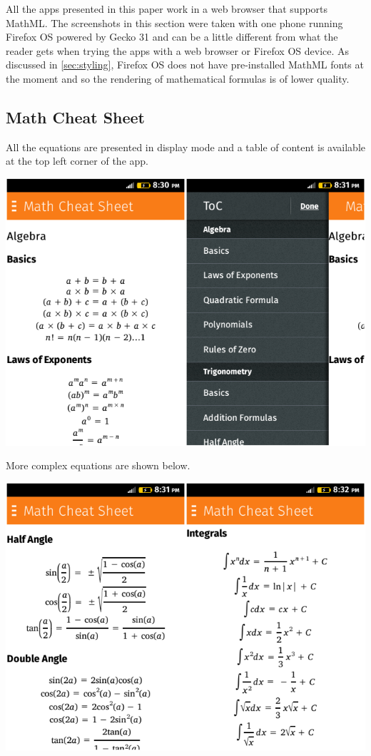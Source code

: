 All the apps presented in this paper work in a web browser that supports MathML.
The screenshots in this section were taken with one phone running Firefox OS
powered by Gecko 31 and can be a little different from what the reader gets when
trying the apps with a web browser or Firefox OS device. As discussed in
\ref{sec:styling}, Firefox OS does not have pre-installed MathML fonts at the
moment and so the rendering of mathematical formulas is of lower quality.

\subsection{Math Cheat Sheet}

All the equations are presented in display mode and a table of content is
available at the top left corner of the app.

\href{http://r-gaia-cs.github.io/math-cheat-sheet/}{\includegraphics[width=\textwidth]{screenshots/8-math-cheat-sheet-A}}

More complex equations are shown below.

\href{http://r-gaia-cs.github.io/math-cheat-sheet/}{\includegraphics[width=\textwidth]{screenshots/8-math-cheat-sheet-B}}

